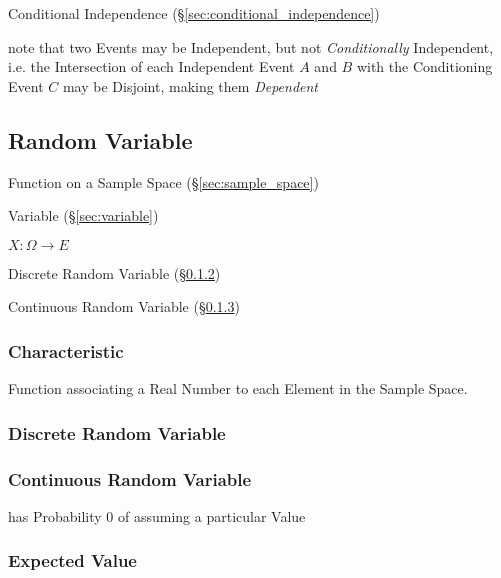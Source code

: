 \fist Conditional Independence (\S\ref{sec:conditional_independence})

note that two Events may be Independent, but not \emph{Conditionally}
Independent, i.e. the Intersection of each Independent Event $A$ and $B$ with
the Conditioning Event $C$ may be Disjoint, making them \emph{Dependent}



\subsection{Random Variable}\label{sec:random_variable}

Function on a Sample Space (\S\ref{sec:sample_space})

Variable (\S\ref{sec:variable})

$X : \Omega \rightarrow E$

Discrete Random Variable (\S\ref{sec:discrete_random_variable})

Continuous Random Variable (\S\ref{sec:continuous_random_variable})



\subsubsection{Characteristic}\label{sec:characteristic}

Function associating a Real Number to each Element in the Sample
Space.



\subsubsection{Discrete Random Variable}
\label{sec:discrete_random_variable}

\subsubsection{Continuous Random Variable}
\label{sec:continuous_random_variable}

has Probability $0$ of assuming a particular Value



\subsubsection{Expected Value}\label{sec:expected_value}

